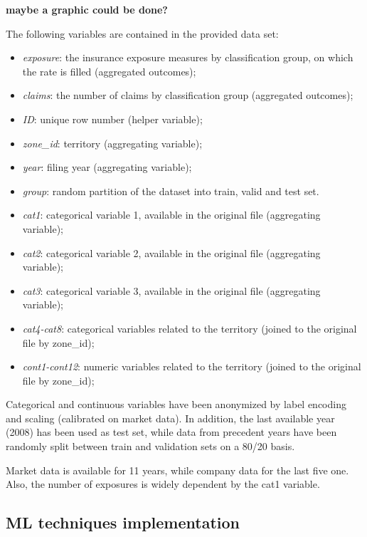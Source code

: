 \documentclass[
]{article}
\providecommand{\tightlist}{%
  \setlength{\itemsep}{0pt}\setlength{\parskip}{0pt}}
\begin{document}
\textbf{maybe a graphic could be done?}

The following variables are contained in the provided data set:

\begin{itemize}
\tightlist
\item
  \emph{exposure}: the insurance exposure measures by classification
  group, on which the rate is filled (aggregated outcomes);
\item
  \emph{claims}: the number of claims by classification group
  (aggregated outcomes);
\item
  \emph{ID}: unique row number (helper variable);
\item
  \emph{zone\_id}: territory (aggregating variable);
\item
  \emph{year}: filing year (aggregating variable);
\item
  \emph{group}: random partition of the dataset into train, valid and
  test set.
\item
  \emph{cat1}: categorical variable 1, available in the original file
  (aggregating variable);
\item
  \emph{cat2}: categorical variable 2, available in the original file
  (aggregating variable);
\item
  \emph{cat3}: categorical variable 3, available in the original file
  (aggregating variable);
\item
  \emph{cat4-cat8}: categorical variables related to the territory
  (joined to the original file by zone\_id);
\item
  \emph{cont1-cont12}: numeric variables related to the territory
  (joined to the original file by zone\_id);
\end{itemize}

Categorical and continuous variables have been anonymized by label
encoding and scaling (calibrated on market data). In addition, the last
available year (2008) has been used as test set, while data from
precedent years have been randomly split between train and validation
sets on a 80/20 basis.

Market data is available for 11 years, while company data for the last
five one. Also, the number of exposures is widely dependent by the cat1
variable.

\hypertarget{ml-techniques-implementation}{%
\subsection{ML techniques
implementation}\label{ml-techniques-implementation}}
\end{document}
